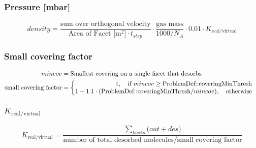 \subsubsection*{Pressure [mbar]}
\begin{equation}
	\label{eq:pressure}
	density=\frac{\text{sum over orthogonal velocity}}{\text{Area of Facet [m$^2$]} \cdot t_{step}} \cdot \frac{\text{gas mass}}{1000/N_A} \cdot 0.01 \cdot K_{\text{real}/\text{virtual}}
\end{equation}

\subsubsection*{Small covering factor}
\begin{equation}
	\label{eq:smallcov}
	\begin{split}
	mincov&=\text{Smallest covering on a single facet that desorbs}\\
	\text{small covering factor}&=
	\begin{cases}
		\begin{split}
		1,  \text{\quad if}\ mincov \geq \text{ProblemDef::coveringMinThresh}\\
		1+1.1 \cdot (\text{ProblemDef::coveringMinThresh}/mincov), \text{\quad otherwise}\\
		\end{split}
	\end{cases}
	\end{split}
\end{equation}

\subsubsection*{$K_{\text{real}/\text{virtual}}$}
\begin{equation}
	\label{eq:krealvirt}
	K_{\text{real}/\text{virtual}}=\frac{\sum\limits_{\text{facets}}\Big(out + des\Big)}{\text{number of total desorbed molecules/small covering factor}}
\end{equation}

